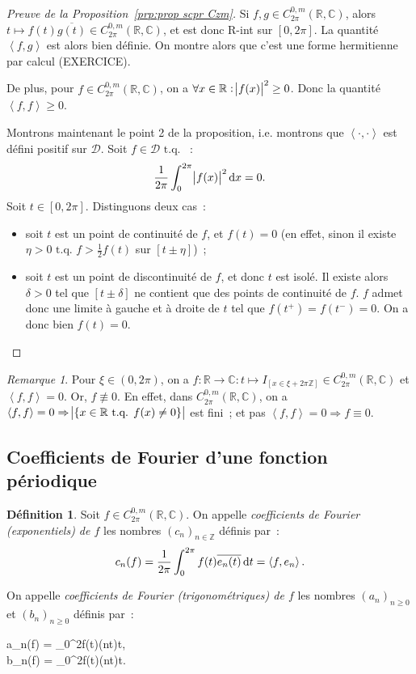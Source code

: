 \documentclass{report}
\theoremstyle{definition}
\newtheorem{déf}[thm]{Définition}
\theoremstyle{remark}
\newtheorem*{rmq}{Remarque}
\numberwithin{equation}{section}
\newcommand{\C}{\mathbb C}
\newcommand{\R}{\mathbb R}
\newcommand{\Z}{\mathbb Z}
\newcommand{\tq}{\text{ t.q. }}
\newcommand{\scpr}[2]{\left\langle #1, #2\right\rangle}
\newcommand{\CmT}[2]{C^{#1,m}_{#2}}
\newcommand{\CzmT}[1]{\CmT 0{#1}}
\newcommand{\Czm}{\CzmT{2\pi}}
\begin{document}
			\begin{proof}[Preuve de la Proposition~\ref{prp:prop scpr Czm}] Si $f, g \in \Czm(\R, \C)$, alors $t \mapsto f(t)\overline {g(t)} \in \Czm(\R, \C)$,
			et est donc R-int sur $[0, 2\pi]$. La quantité $\scpr fg$ est alors bien définie. On montre alors que c'est une forme hermitienne par calcul (EXERCICE).

			De plus, pour $f \in \Czm(\R, \C)$, on a $\forall x \in \R : \abs {f(x)}^2 \geq 0$. Donc la quantité $\scpr ff \geq 0$.

			Montrons maintenant le point 2 de la proposition, i.e. montrons que $\scpr \cdot\cdot$ est défini positif sur $\mathcal D$. Soit $f \in \mathcal D \tq$~:
			\begin{equation}
				\frac 1{2\pi}\int_0^{2\pi}\abs {f(x)}^2\dif x = 0.
			\end{equation}
			Soit $t \in [0, 2\pi]$. Distinguons deux cas~:
			\begin{itemize}
				\item soit $t$ est un point de continuité de $f$, et $f(t) = 0$ (en effet, sinon il existe $\eta > 0 \tq f > \frac 12f(t)$ sur $[t \pm \eta]$)~;
				\item soit $t$ est un point de discontinuité de $f$, et donc $t$ est isolé. Il existe alors $\delta > 0$ tel que $[t \pm \delta]$ ne contient que des
				points de continuité de $f$. $f$ admet donc une limite à gauche et à droite de $t$ tel que $f(t^+) = f(t^-) = 0$. On a donc bien $f(t) = 0$.
			\end{itemize}
			\end{proof}

			\begin{rmq} Pour $\xi \in (0, 2\pi)$, on a $f : \R \to \C : t \mapsto I_{[x \in \xi + 2\pi\Z]} \in \Czm(\R, \C)$ et $\scpr ff = 0$. Or, $f \not \equiv 0$.
			En effet, dans $\Czm(\R, \C)$, on a $\scpr ff = 0 \Rightarrow \abs {\{x \in \R \tq f(x) \neq 0\}}$ est fini~; et pas $\scpr ff = 0 \Rightarrow f \equiv 0$.
			\end{rmq}

		\subsection{Coefficients de Fourier d'une fonction périodique}
			\begin{déf} Soit $f \in \Czm(\R, \C)$. On appelle \textit{coefficients de Fourier (exponentiels) de $f$} les nombres $(c_n)_{n \in \Z}$ définis par~:
			\begin{equation}
				c_n(f) = \frac 1{2\pi}\int_0^{2\pi}f(t)\overline {e_n(t)}\dif t = \scpr f{e_n}.
			\end{equation}

			On appelle \textit{coefficients de Fourier (trigonométriques) de $f$} les nombres $(a_n)_{n \geq 0}$ et $(b_n)_{n \geq 0}$ définis par~:
			\begin{subnumcases}{}
				a_n(f) = \pi\int_0^{2\pi}f(t)\cos(nt)\dif t, \\
				b_n(f) = \pi\int_0^{2\pi}f(t)\sin(nt)\dif t.
			\end{subnumcases}
			\end{déf}
\end{document}
